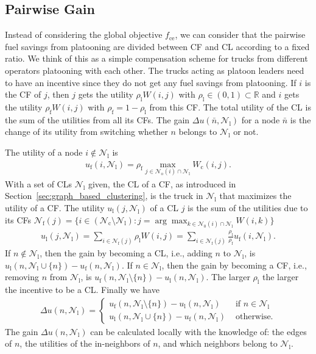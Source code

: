 \documentclass[letterpaper,10pt,conference,twocolumn]{IEEEtran}
\newcommand{\set}[1]{\mathcal{#1}}
\newcommand{\op}[1]{\mathrm{#1}}
\theoremstyle{definition}
\begin{document}
\subsection{Pairwise Gain}
\label{sec:individual_objective}

Instead of considering the global objective $f_\op{ce}$, we can consider that the pairwise fuel savings from platooning are divided between CF and CL according to a fixed ratio. We think of this as a simple compensation scheme for trucks from different operators platooning with each other. The trucks acting as platoon leaders need to have an incentive since they do not get any fuel savings from platooning. If $i$ is the CF of $j$, then $j$ gets the utility $\rho_\op{l} W(i,j)$ with $\rho_\op{l} \in (0, 1) \subset \mathbb{R}$ and $i$ gets the utility $\rho_\op{f} W(i,j)$ with $\rho_\op{f} = 1-\rho_\op{l}$ from this CF. The total utility of the CL is the sum of the utilities from all its CFs. The gain $\Delta u(\bar{n},\set{N}_\op{l})$ for a node $\bar{n}$ is the change of its utility from switching whether $n$ belongs to $\set{N}_\op{l}$ or not. 

The utility of a node $i \notin \set{N}_\op{l}$ is 
\begin{align*}
 u_\op{f}(i,\set{N}_\op{l}) = 
\rho_\op{f} \max\limits_{j \in \set{N}_\op{o}(i) \cap \set{N}_\op{l}}W_\op{c}(i,j).
\end{align*}
With a set of CLs $\set{N}_\op{l}$ given, the CL of a CF, as introduced in Section~\ref{sec:graph_based_clustering}, is the truck in $\set{N}_\op{l}$ that maximizes the utility of a CF. The utility $u_\op{l}(j,\set{N}_\op{l})$ of a CL $j$ is the sum of the utilities due to its CFs $\set{N}_\op{f}(j) = \{ i \in (\set{N}_\op{c}\setminus \set{N}_\op{l}):j = \arg \max_{k \in \set{N}_\op{0}(i) \cap \set{N}_\op{l}}W(i,k)\}$
\begin{align*}
 u_\op{l}(j,\set{N}_\op{l}) = \sum\limits_{i \in \set{N}_\op{f}(j) } \rho_\op{l} W(i,j) = \sum\limits_{i \in \set{N}_\op{f}(j) } \frac{\rho_\op{l}}{\rho_\op{f}} u_\op{f}(i,\set{N}_\op{l}).
\end{align*}
If $n \notin \set{N}_\op{l}$, then the gain by becoming a CL, i.e., adding $n$ to $\set{N}_\op{l}$, is
$u_\op{l}(n,\set{N}_\op{l} \cup \{n\}) - u_\op{f}(n,\set{N}_\op{l})$.
If $n \in \set{N}_\op{l}$, then the gain by becoming a CF, i.e., removing $n$ from $\set{N}_\op{l}$, is
$u_\op{f}(n,\set{N}_\op{l} \setminus \{n\}) - u_\op{l}(n,\set{N}_\op{l})$. The larger $\rho_\op{l}$ the larger the incentive to be a CL.
Finally we have
\begin{align}
 \Delta u(n,\set{N}_\op{l}) = \left\{ \begin{array}{ll}
                   u_\op{f}(n,\set{N}_\op{l} \setminus \{n\}) - u_\op{l}(n,\set{N}_\op{l}) & \text{ if } n \in \set{N}_\op{l}\\
                   u_\op{l}(n,\set{N}_\op{l} \cup \{n\}) - u_\op{f}(n,\set{N}_\op{l}) & \text{ otherwise.}
                  \end{array} \right.\label{eq:delta_u_g}
\end{align}
The gain $\Delta u(n,\set{N}_\op{l})$ can be calculated locally with the knowledge of: the edges of $n$, the utilities of the in-neighbors of $n$, and which neighbors belong to $\set{N}_\op{l}$.
\end{document}
